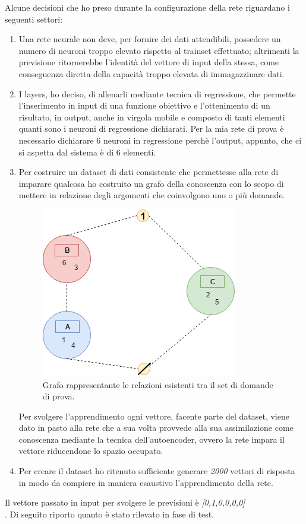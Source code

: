 Alcune decisioni che ho preso durante la configurazione della rete riguardano i seguenti settori:
\begin{enumerate}
\item Una rete neurale non deve, per fornire dei dati attendibili, possedere un numero di neuroni troppo elevato rispetto al trainset effettuato; altrimenti la previsione  ritornerebbe l'identit\`a del vettore di input della stessa, come conseguenza diretta della capacit\`a troppo elevata di immagazzinare dati.
\item I layers, ho deciso, di allenarli mediante tecnica di regressione, che permette l'inserimento in input di una funzione obiettivo e l'ottenimento di un risultato, in output, anche in virgola mobile e composto di tanti elementi quanti sono i neuroni di regressione dichiarati. Per la mia rete di prova \`e necessario dichiarare  6 neuroni in regressione perch\`e l'output, appunto, che ci si aspetta dal sistema \`e di 6 elementi.
\item Per costruire un dataset di dati consistente che permettesse alla rete di imparare qualcosa ho costruito un grafo della conoscenza con lo scopo di mettere in relazione degli argomenti che coinvolgono uno o pi\`u domande.
\begin{figure}[H]
\centering
	\includegraphics[width=0.60\linewidth]{./image/grafo_trainset.png}
	\caption{Grafo rappresentante le relazioni esistenti tra il set di domande di prova.}
\end{figure}
\noindent
Per svolgere l'apprendimento ogni vettore, facente parte del dataset, viene dato in pasto alla rete che a sua volta provvede alla sua assimilazione come conoscenza mediante la tecnica dell'autoencoder, ovvero la rete impara il vettore riducendone lo spazio occupato.
\item Per creare il dataset ho ritenuto sufficiente generare \textit{2000} vettori di risposta in modo da compiere in maniera esaustivo l'apprendimento della rete.
\end{enumerate}
\noindent
Il vettore passato in input per svolgere le previsioni \`e \textit{[0,1,0,0,0,0]}\\
\noindent. 
Di seguito riporto quanto \`e stato rilevato in fase di test.

